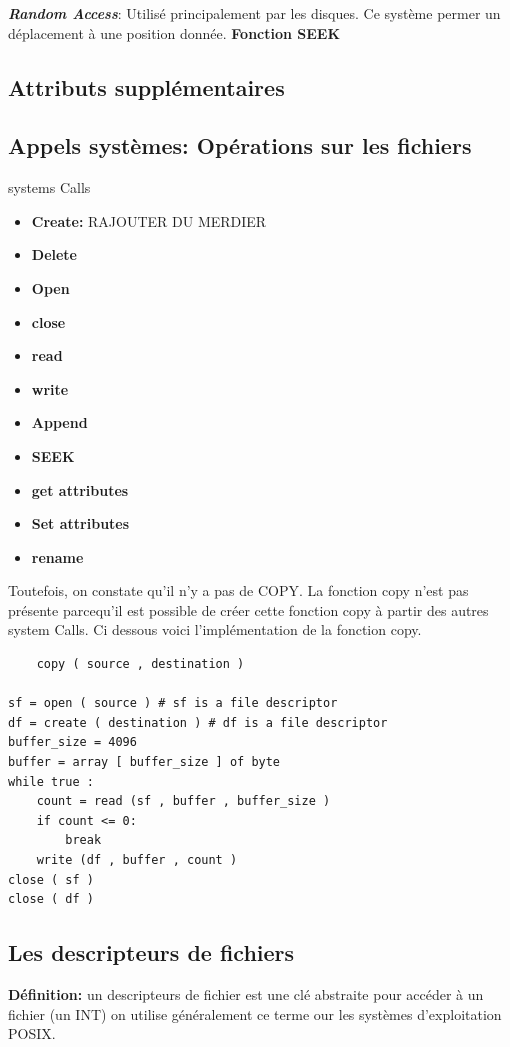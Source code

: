 \textbf{\textit{Random Access}}: Utilisé principalement par les disques. Ce système permer un déplacement à une position donnée. \textbf{Fonction SEEK}
\subsection{Attributs supplémentaires}


\subsection{Appels systèmes: Opérations sur les fichiers}
systems Calls
\begin{itemize}
    \item \textbf{Create: } RAJOUTER DU MERDIER
    \item \textbf{Delete}
    \item \textbf{Open}
    \item \textbf{close}
    \item \textbf{read}
    \item \textbf{write}
    \item \textbf{Append}
    \item \textbf{SEEK}
    \item \textbf{get attributes}
    \item \textbf{Set attributes}
    \item \textbf{rename}

\end{itemize}
Toutefois, on constate qu'il n'y a pas de COPY. La fonction copy n'est pas présente parcequ'il est possible de créer cette fonction copy à partir des autres system Calls. Ci dessous voici l'implémentation de la fonction copy.\\[.5cm]

\begin{lstlisting}
    copy ( source , destination )

sf = open ( source ) # sf is a file descriptor
df = create ( destination ) # df is a file descriptor
buffer_size = 4096
buffer = array [ buffer_size ] of byte
while true :
    count = read (sf , buffer , buffer_size )
    if count <= 0:
        break
    write (df , buffer , count )
close ( sf )
close ( df )
\end{lstlisting}

\subsection{Les descripteurs de fichiers}
\textbf{Définition: }un descripteurs de fichier est une clé abstraite pour accéder à un fichier (un INT) on utilise généralement ce terme our les systèmes d'exploitation POSIX.

